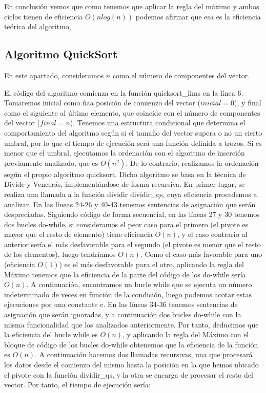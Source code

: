 \documentclass{homework}
\begin{document}
    En conclusión vemos que como tenemos que aplicar la regla del máximo y ambos ciclos tienen de eficiencia $O(nlog(n))$ podemos afirmar que esa es la eficiencia
    teórica del algoritmo, 

    \subsection{Algoritmo QuickSort}
    
     

    En este apartado, consideramos $n$ como el número de componentes del vector. 

    El código del algoritmo comienza en la función quicksort\_lims en la línea 6. Tomaremos inicial 
    como ñaa posición de comienzo del vector ($inicial = 0$), y final como el siguiente al último elemento, 
    que coincide con el número de componentes del vector ($final = n$).
    Tenemos una estructura condicional que determina el comportamiento del algoritmo según si el tamaño del vector 
    supera o no un cierto umbral, por lo que el tiempo de ejecución será una función definida a trozos. Si es menor 
    que el umbral, ejecutamos la ordenación con el algoritmo de inserción previamente analizado, que es $O(n^2)$. De lo
    contrario, realizamos la ordenación según el propio algoritmo quicksort. Dicho algoritmo se basa en la técnica de Divide
    y Vencerás, implementándose de forma recursiva. En primer lugar, se realiza una llamada a la función dividir dividir\_qs, 
    cuya eficiencia procedemos a analizar. En las líneas 24-26 y 40-43 tenemos sentencias de asignación que serán despreciadas. 
    Siguiendo código de forma secuencial, en las líneas 27 y 30 tenemos dos bucles do-while, si consideramos el peor caso para 
    el primero (el pivote es mayor que el resto de elemento) tiene eficiencia $O(n)$, y el caso contrario al anterior sería el 
    más desfavorable para el segundo (el pivote es menor que el resto de los elementos), luego tendríamos $O(n)$. Como el caso más 
    favorable para uno (eficiencia $O(1)$) es el más desfavorable para el otro, aplicando la regla del Máximo tenemos que la 
    eficiencia de la parte del código de los do-while sería $O(n)$.  A continuación, encontramos un bucle while que se ejecuta un 
    número indeterminado de veces en función de la condición, luego podemos acotar estas ejecuciones por una constante c. En las 
    líneas 34-36 tenemos sentencias de asignación que serán ignoradas, y a continuación dos bucles do-while con la misma funcionalidad
    que los analizados anteriormente. Por tanto, deducimos que la eficiencia del bucle while es $O(n)$, y aplicando la regla del 
    Máximo con el bloque de código de los bucles do-while obtenemos que la eficiencia de la función es $O(n)$. A continuación hacemos dos llamadas
    recursivas, una que procesará los datos desde el comienzo del mismo hasta la posición en la que hemos ubicado el pivote con la 
    función dividir\_qs, y la otra se encarga de procesar el resto del vector. Por tanto, el tiempo de ejecución sería:
\end{document}
